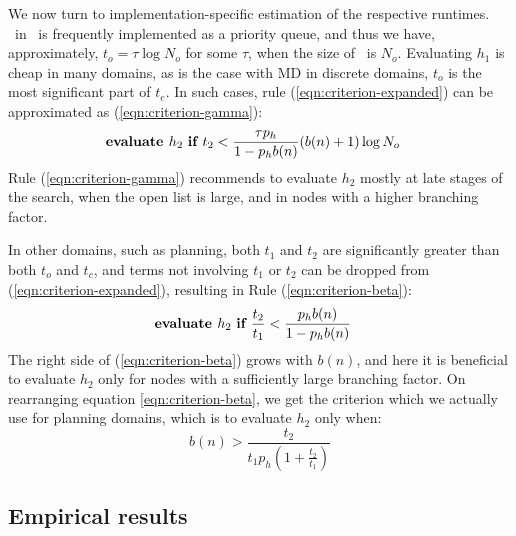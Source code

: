 We now turn to implementation-specific estimation of the respective runtimes.
\OPEN~in \astar~is frequently implemented as a priority queue, and thus we have, approximately,
$t_o=\tau \log N_o$ for some $\tau$, when the size of \OPEN~is $N_o$.
Evaluating $h_1$ is cheap in many domains, as is the
case with MD in discrete domains, $t_o$ is the most significant part of
$t_{e}$. In such cases,
rule (\ref{eqn:criterion-expanded}) can be approximated as (\ref{eqn:criterion-gamma}):
\begin{align}
  &\mbox{\bf evaluate }h_2\mbox{ \bf if } t_2 < \frac {\tau p_h} {1-p_hb(n)} (b(n)+1)\log N_o
\label{eqn:criterion-gamma}
\end{align}
Rule (\ref{eqn:criterion-gamma})
recommends to evaluate $h_2$ mostly at late stages of the search,
when the open list is large, and in nodes with a higher branching factor.

In other domains, such as planning, both $t_1$ and $t_2$ are
significantly greater than both $t_o$ and $t_c$, and terms
not involving $t_1$ or $t_2$ can be dropped from
(\ref{eqn:criterion-expanded}), resulting in Rule (\ref{eqn:criterion-beta}):
\begin{align}
  &\mbox{\bf evaluate }h_2\mbox{ \bf if } \frac{t_2}{t_1} < \frac {p_hb(n)} {1-p_hb(n)}
\label{eqn:criterion-beta}
\end{align}
The right side of (\ref{eqn:criterion-beta}) grows with $b(n)$, and here it is beneficial to evaluate $h_2$
only for nodes with a sufficiently large branching factor. On rearranging equation \ref{eqn:criterion-beta},
we get the criterion which we actually use for planning domains,
which is to evaluate $h_2$ only when:
\begin{equation}
b(n) > \frac{t_2}{t_1 p_h (1 + \frac{t_2}{t_1})}
\label{eq:planning-rule}
\end{equation}

\subsection{Empirical results}


